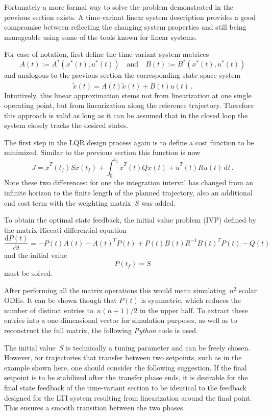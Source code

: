 \documentclass[a4paper,11pt,headinclude=true,headsepline,parskip=half,DIV=13]{scrartcl}
\newcommand*\luainputlisting[2]{
    \luadirect{print_code_part(\luastring{#1}, \luastring{#2})}
}
\newcommand{\py}{\emph{Python}\xspace}
\begin{document}
Fortunately a more formal way to solve the problem demonstrated in the previous section exists.
A time-variant linear system description provides a good compromise between reflecting the changing system properties and still being manageable using some of the tools known for linear systems.

For ease of notation, first define the time-variant system matrices
$$
A(t):=A^*(x^*(t), u^*(t)) \quad \text{and} \quad B(t):=B^*(x^*(t),u^*(t))
$$
and analogous to the previous section the corresponding state-space system
$$
\dot{\tilde x}(t) = A(t)\tilde x(t) + B(t) u(t)\, .
$$
Intuitively, this linear approximation stems not from linearization at one single operating point, but from linearization along the reference trajectory.
Therefore this approach is valid as long as it can be assumed that in the closed loop the system closely tracks the desired states.

The first step in the LQR design process again is to define a cost function to be minimized.
Similar to the previous section this function is now
$$
J=\tilde x^T(t_f) S \tilde x(t_f) +\int_0^{t_f} \tilde x^T(t) Q x(t) + \tilde u^T(t) R u(t) \, \mathrm d t\, .
$$
Note these two differences: for one the integration interval has changed from an infinite horizon to the finite length of the planned trajectory, also an additional end cost term with the weighting matrix~$S$ was added.

To obtain the optimal state feedback, the initial value problem (IVP) defined by the matrix Riccati differential equation
\begin{equation}
\frac{\mathrm d P(t)}{\mathrm d t}= -P(t)A(t) - A(t)^T P(t) + P(t) B(t) R^{-1} B(t)^T P(t) - Q(t)
\label{eq:riccati_ivp}
\end{equation}
and the initial value
$$
P(t_f) = S
$$
must be solved.

After performing all the matrix operations this would mean simulating~$n^2$ scalar ODEs.
It can be shown though that $P(t)$ is symmetric, which reduces the number of distinct entries to~$n(n+1)/2$ in the upper half.
To extract these entries into a one-dimensional vector for simulation purposes, as well as to reconstruct the full matrix, the following \py code is used.
\luainputlisting{../sim/01_lqr.py}{triuconvert}

The initial value~$S$ is technically a tuning parameter and can be freely chosen.
However, for trajectories that transfer between two setpoints, such as in the example shown here, one should consider the following suggestion.
If the final setpoint is to be stabilized after the transfer phase ends, it is desirable for the final state feedback of the time-variant section to be identical to the feedback designed for the LTI system resulting from linearization around the final point.
This ensures a smooth transition between the two phases.
\end{document}
